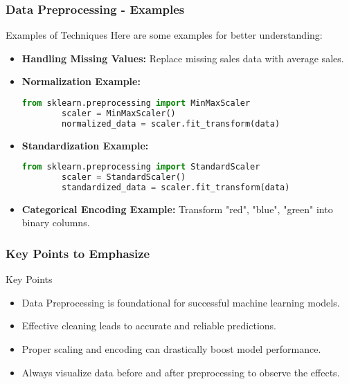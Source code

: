 \documentclass[aspectratio=169]{beamer}
\begin{document}
\begin{frame}[fragile]
    \frametitle{Data Preprocessing - Examples}
    \begin{block}{Examples of Techniques}
        Here are some examples for better understanding:
    \end{block}
    \begin{itemize}
        \item \textbf{Handling Missing Values:} 
            Replace missing sales data with average sales.
        
        \item \textbf{Normalization Example:}
        \begin{lstlisting}[language=Python]
        from sklearn.preprocessing import MinMaxScaler
        scaler = MinMaxScaler()
        normalized_data = scaler.fit_transform(data)
        \end{lstlisting}
        
        \item \textbf{Standardization Example:}
        \begin{lstlisting}[language=Python]
        from sklearn.preprocessing import StandardScaler
        scaler = StandardScaler()
        standardized_data = scaler.fit_transform(data)
        \end{lstlisting}
        
        \item \textbf{Categorical Encoding Example:}
        Transform "red", "blue", "green" into binary columns.
    \end{itemize}
\end{frame}

\begin{frame}[fragile]
    \frametitle{Key Points to Emphasize}
    \begin{block}{Key Points}
        \begin{itemize}
            \item Data Preprocessing is foundational for successful machine learning models.
            \item Effective cleaning leads to accurate and reliable predictions.
            \item Proper scaling and encoding can drastically boost model performance.
            \item Always visualize data before and after preprocessing to observe the effects.
        \end{itemize}
    \end{block}
\end{frame}
\end{document}
